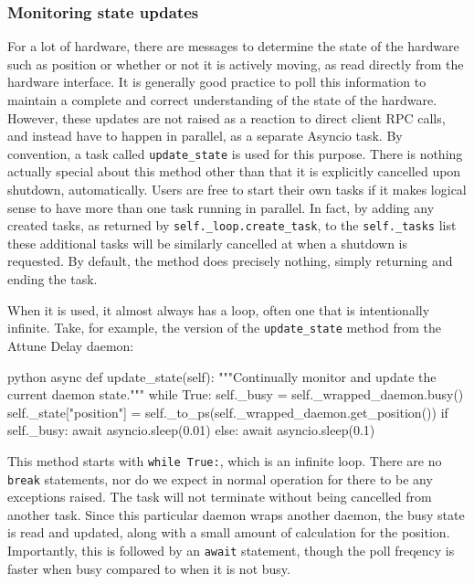 \subsubsection{Monitoring state updates}

For a lot of hardware, there are messages to determine the state of the hardware such as position or whether or not it is actively moving, as read directly from the hardware interface.
It is generally good practice to poll this information to maintain a complete and correct understanding of the state of the hardware.
However, these updates are not raised as a reaction to direct client RPC calls, and instead have to happen in parallel, as a separate Asyncio task.
By convention, a task called \texttt{update\_state} is used for this purpose.
There is nothing actually special about this method other than that it is explicitly cancelled upon shutdown, automatically.
Users are free to start their own tasks if it makes logical sense to have more than one task running in parallel.
In fact, by adding any created tasks, as returned by \texttt{self.\_loop.create\_task}, to the \texttt{self.\_tasks} list these additional tasks will be similarly cancelled at when a shutdown is requested.
By default, the method does precisely nothing, simply returning and ending the task.

When it is used, it almost always has a loop, often one that is intentionally infinite.
Take, for example, the version of the \texttt{update\_state} method from the Attune Delay daemon:

\begin{codefragment}{python}
    async def update_state(self):
        """Continually monitor and update the current daemon state."""
        while True:
            self._busy = self._wrapped_daemon.busy()
            self._state["position"] = self._to_ps(self._wrapped_daemon.get_position())
            if self._busy:
                await asyncio.sleep(0.01)
            else:
                await asyncio.sleep(0.1)
\end{codefragment}

This method starts with \texttt{while True:}, which is an infinite loop.
There are no \texttt{break} statements, nor do we expect in normal operation for there to be any exceptions raised.
The task will not terminate without being cancelled from another task.
Since this particular daemon wraps another daemon, the busy state is read and updated, along with a small amount of calculation for the position.
Importantly, this is followed by an \texttt{await} statement, though the poll freqency is faster when busy compared to when it is not busy.


